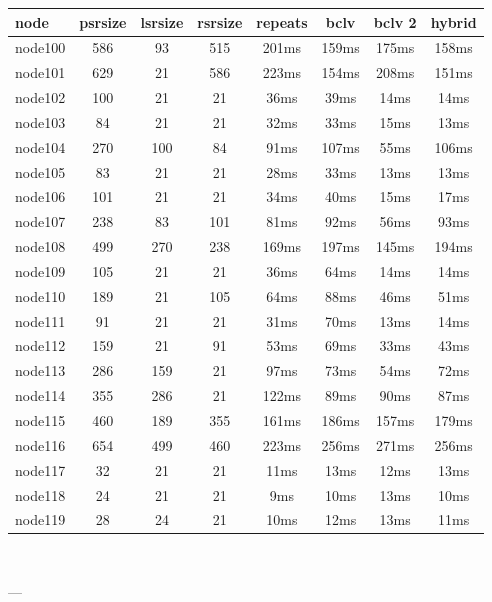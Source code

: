 \begin{tabular}{|l|c|c|c|c|c|c|c|}
\hline node & psrsize & lsrsize & rsrsize   & repeats & bclv & bclv 2 & hybrid\\
    \hline node100 & 586 & 93 & 515 & 201ms & 159ms & 175ms & 158ms\\
    \hline node101 & 629 & 21 & 586 & 223ms & 154ms & 208ms & 151ms\\
    \hline node102 & 100 & 21 & 21 & 36ms & 39ms & 14ms & 14ms\\
    \hline node103 & 84 & 21 & 21 & 32ms & 33ms & 15ms & 13ms\\
    \hline node104 & 270 & 100 & 84 & 91ms & 107ms & 55ms & 106ms\\
    \hline node105 & 83 & 21 & 21 & 28ms & 33ms & 13ms & 13ms\\
    \hline node106 & 101 & 21 & 21 & 34ms & 40ms & 15ms & 17ms\\
    \hline node107 & 238 & 83 & 101 & 81ms & 92ms & 56ms & 93ms\\
    \hline node108 & 499 & 270 & 238 & 169ms & 197ms & 145ms & 194ms\\
    \hline node109 & 105 & 21 & 21 & 36ms & 64ms & 14ms & 14ms\\
    \hline node110 & 189 & 21 & 105 & 64ms & 88ms & 46ms & 51ms\\
    \hline node111 & 91 & 21 & 21 & 31ms & 70ms & 13ms & 14ms\\
    \hline node112 & 159 & 21 & 91 & 53ms & 69ms & 33ms & 43ms\\
    \hline node113 & 286 & 159 & 21 & 97ms & 73ms & 54ms & 72ms\\
    \hline node114 & 355 & 286 & 21 & 122ms & 89ms & 90ms & 87ms\\
    \hline node115 & 460 & 189 & 355 & 161ms & 186ms & 157ms & 179ms\\
    \hline node116 & 654 & 499 & 460 & 223ms & 256ms & 271ms & 256ms\\
    \hline node117 & 32 & 21 & 21 & 11ms & 13ms & 12ms & 13ms\\
    \hline node118 & 24 & 21 & 21 & 9ms & 10ms & 13ms & 10ms\\
    \hline node119 & 28 & 24 & 21 & 10ms & 12ms & 13ms & 11ms\\

\hline
\end{tabular} \

---


